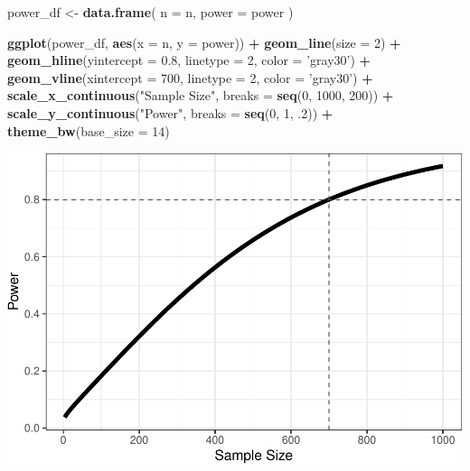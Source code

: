 \documentclass[man]{apa6}
\newenvironment{Shaded}{\begin{snugshade}}{\end{snugshade}}
\newcommand{\DataTypeTok}[1]{\textcolor[rgb]{0.13,0.29,0.53}{#1}}
\newcommand{\DecValTok}[1]{\textcolor[rgb]{0.00,0.00,0.81}{#1}}
\newcommand{\FloatTok}[1]{\textcolor[rgb]{0.00,0.00,0.81}{#1}}
\newcommand{\KeywordTok}[1]{\textcolor[rgb]{0.13,0.29,0.53}{\textbf{#1}}}
\newcommand{\NormalTok}[1]{#1}
\newcommand{\OperatorTok}[1]{\textcolor[rgb]{0.81,0.36,0.00}{\textbf{#1}}}
\newcommand{\StringTok}[1]{\textcolor[rgb]{0.31,0.60,0.02}{#1}}
\begin{document}
\begin{Shaded}
\begin{Highlighting}[]
\NormalTok{power_df <-}\StringTok{ }\KeywordTok{data.frame}\NormalTok{(}
  \DataTypeTok{n =}\NormalTok{ n,}
  \DataTypeTok{power =}\NormalTok{ power}
\NormalTok{)}

\KeywordTok{ggplot}\NormalTok{(power_df, }\KeywordTok{aes}\NormalTok{(}\DataTypeTok{x =}\NormalTok{ n, }\DataTypeTok{y =}\NormalTok{ power)) }\OperatorTok{+}\StringTok{ }
\StringTok{  }\KeywordTok{geom_line}\NormalTok{(}\DataTypeTok{size =} \DecValTok{2}\NormalTok{) }\OperatorTok{+}\StringTok{ }
\StringTok{  }\KeywordTok{geom_hline}\NormalTok{(}\DataTypeTok{yintercept =} \FloatTok{0.8}\NormalTok{, }\DataTypeTok{linetype =} \DecValTok{2}\NormalTok{, }\DataTypeTok{color =} \StringTok{'gray30'}\NormalTok{) }\OperatorTok{+}\StringTok{ }
\StringTok{  }\KeywordTok{geom_vline}\NormalTok{(}\DataTypeTok{xintercept =} \DecValTok{700}\NormalTok{, }\DataTypeTok{linetype =} \DecValTok{2}\NormalTok{, }\DataTypeTok{color =} \StringTok{'gray30'}\NormalTok{) }\OperatorTok{+}
\StringTok{  }\KeywordTok{scale_x_continuous}\NormalTok{(}\StringTok{"Sample Size"}\NormalTok{, }\DataTypeTok{breaks =} \KeywordTok{seq}\NormalTok{(}\DecValTok{0}\NormalTok{, }\DecValTok{1000}\NormalTok{, }\DecValTok{200}\NormalTok{)) }\OperatorTok{+}\StringTok{ }
\StringTok{  }\KeywordTok{scale_y_continuous}\NormalTok{(}\StringTok{"Power"}\NormalTok{, }\DataTypeTok{breaks =} \KeywordTok{seq}\NormalTok{(}\DecValTok{0}\NormalTok{, }\DecValTok{1}\NormalTok{, }\FloatTok{.2}\NormalTok{)) }\OperatorTok{+}
\StringTok{  }\KeywordTok{theme_bw}\NormalTok{(}\DataTypeTok{base_size =} \DecValTok{14}\NormalTok{)}
\end{Highlighting}
\end{Shaded}

\includegraphics{power_simulation_files/figure-latex/power-figure-1.pdf}
\end{document}
